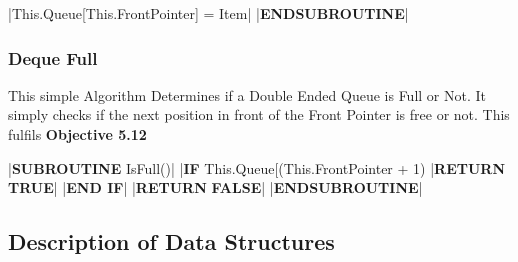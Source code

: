 \begin{flushleft}
\begin{pseudocode}
    |This.Queue[This.FrontPointer] = Item|
|\textbf{ENDSUBROUTINE}|
                \end{pseudocode}

                \vspace{0.5cm}
            \subsubsection{Deque Full}
                This simple Algorithm Determines if a Double Ended Queue is Full or Not. It simply checks if the next position in front of the
                Front Pointer is free or not. This fulfils \textbf{Objective 5.12}
                \vspace{0.2cm}

                \begin{pseudocode}
|\textbf{SUBROUTINE} IsFull()|
    |\textbf{IF} This.Queue[(This.FrontPointer + 1) %
        |\textbf{RETURN} \textbf{TRUE}|
    |\textbf{END IF}|
    |\textbf{RETURN} \textbf{FALSE}|
|\textbf{ENDSUBROUTINE}|
                \end{pseudocode}

                \vspace{0.5cm}
        \subsection{Description of Data Structures}

\end{flushleft}
